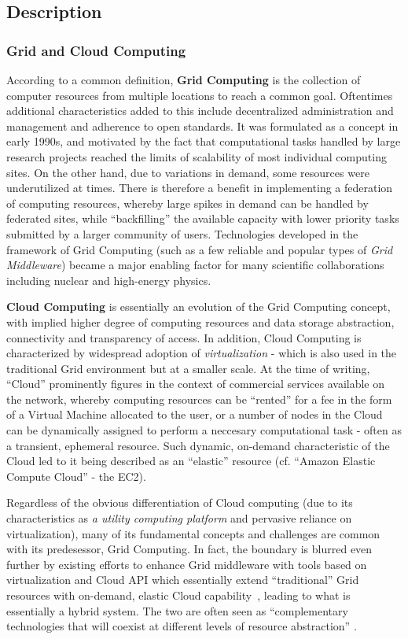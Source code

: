 \subsection{Description}

\subsubsection{Grid and Cloud Computing}
According to a common definition, \textbf{Grid Computing} is the collection of computer resources from multiple locations to reach a common goal. Oftentimes additional characteristics added to this include decentralized
administration and management and adherence to open standards. It was formulated as a concept in early 1990s, and motivated by the fact that computational tasks handled by large research projects reached
the limits of scalability of most individual computing sites. On the other hand, due to variations in demand, some resources were underutilized at times. There is therefore a benefit in implementing a federation of
computing resources, whereby large spikes in demand can be handled by federated sites, while ``backfilling'' the available capacity with lower priority tasks submitted by a larger community of users.
Technologies developed in the framework of Grid Computing (such as a few reliable and popular types of \textit{Grid Middleware}) became a major enabling factor for many scientific collaborations including
nuclear and high-energy physics.

\textbf{Cloud Computing} is essentially an evolution of the Grid Computing concept, with implied higher degree of computing resources and data storage abstraction, connectivity and transparency of access.
In addition, Cloud Computing is characterized by widespread adoption of \textit{virtualization} - which is also used in the traditional Grid environment but at a smaller scale.
At the time of writing, ``Cloud'' prominently figures in the context of commercial services available on the network, whereby computing resources can be ``rented'' for a fee in the form of a Virtual Machine allocated
to the user, or a  number of nodes in the Cloud can be dynamically assigned to perform a neccesary computational task - often as a transient, ephemeral resource. Such dynamic, on-demand characteristic
of the Cloud led to it being described as an ``elastic'' resource (cf. ``Amazon Elastic Compute Cloud'' - the EC2).

Regardless of the obvious differentiation of Cloud computing (due to its characteristics as \textit{a utility computing platform} and pervasive reliance on virtualization), many of its fundamental concepts
and challenges are common with its predesessor, Grid Computing. In fact, the boundary is blurred even further by existing efforts to enhance
Grid middleware with tools based on virtualization and Cloud API which essentially extend ``traditional'' Grid resources with on-demand, elastic Cloud capability~\cite{star_acat11},
leading to what is essentially a hybrid system. The two are often seen as ``complementary technologies that will coexist at different levels of resource abstraction'' \cite{atlas_cloud_chep13}.

